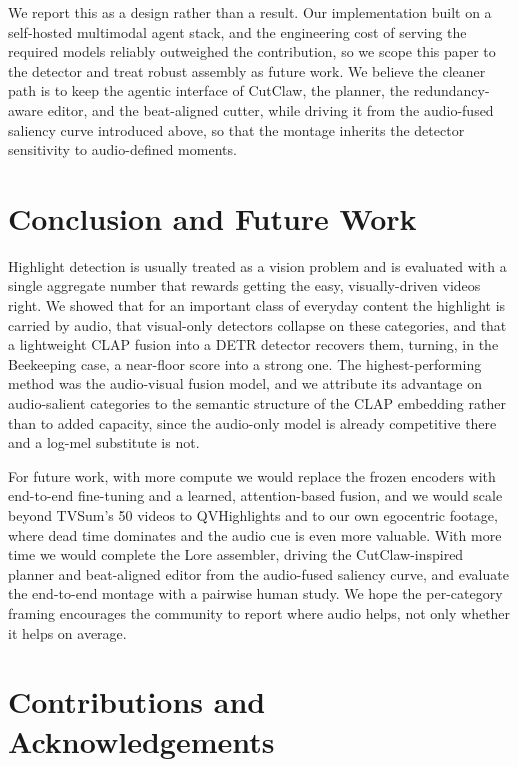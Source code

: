 \documentclass[10pt,twocolumn,letterpaper]{article}
\begin{document}
We report this as a design rather than a result. Our implementation built on a self-hosted multimodal agent stack, and the engineering cost of serving the required models reliably outweighed the contribution, so we scope this paper to the detector and treat robust assembly as future work. We believe the cleaner path is to keep the agentic interface of CutClaw, the planner, the redundancy-aware editor, and the beat-aligned cutter, while driving it from the audio-fused saliency curve introduced above, so that the montage inherits the detector sensitivity to audio-defined moments.

\section{Conclusion and Future Work}

Highlight detection is usually treated as a vision problem and is evaluated with a single aggregate number that rewards getting the easy, visually-driven videos right. We showed that for an important class of everyday content the highlight is carried by audio, that visual-only detectors collapse on these categories, and that a lightweight CLAP fusion into a DETR detector recovers them, turning, in the Beekeeping case, a near-floor score into a strong one. The highest-performing method was the audio-visual fusion model, and we attribute its advantage on audio-salient categories to the semantic structure of the CLAP embedding rather than to added capacity, since the audio-only model is already competitive there and a log-mel substitute is not.

For future work, with more compute we would replace the frozen encoders with end-to-end fine-tuning and a learned, attention-based fusion, and we would scale beyond TVSum's 50 videos to QVHighlights and to our own egocentric footage, where dead time dominates and the audio cue is even more valuable. With more time we would complete the Lore assembler, driving the CutClaw-inspired planner and beat-aligned editor from the audio-fused saliency curve, and evaluate the end-to-end montage with a pairwise human study. We hope the per-category framing encourages the community to report where audio helps, not only whether it helps on average.

\section*{Contributions and Acknowledgements}
\end{document}
